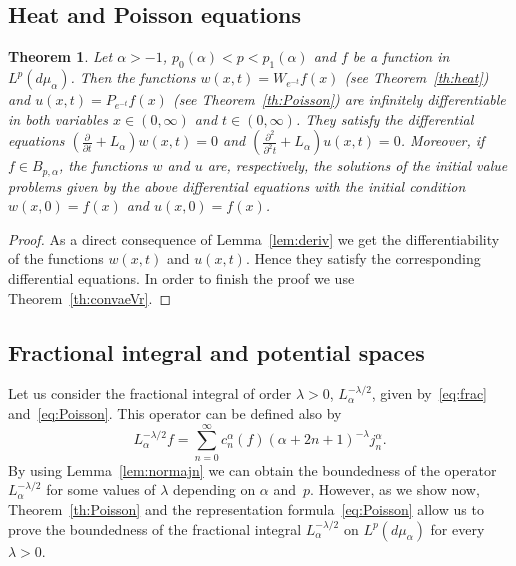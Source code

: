 \documentclass[11pt,a4paper]{amsart}
\newcommand{\mua}{d\mu_\alpha}
\theoremstyle{plain}
\newtheorem{theor}{Theorem}
\theoremstyle{remark}
\begin{document}
\subsection{Heat and Poisson equations}

\begin{theor}
\label{th:DE}
Let $\alpha > -1$, $p_0(\alpha) < p < p_1(\alpha)$ and  $f$ be a function in $L^p(\mua)$.
Then the functions $w(x,t) = W_{e^{-t}}f(x)$ (see Theorem~\ref{th:heat})
and $u(x,t) = P_{e^{-t}}f(x)$ (see Theorem~\ref{th:Poisson}) are infinitely differentiable in both variables $x\in (0,\infty)$ and $t\in(0,\infty)$.
They satisfy the differential equations
$\left( \frac{\partial}{\partial t} + L_\alpha \right) w(x,t) = 0$
and $\left( \frac{\partial^2}{\partial^2 t} + L_\alpha \right) u(x,t) = 0$.
Moreover, if $f\in B_{p,\alpha}$, the functions $w$ and $u$ are, respectively,
the solutions of the initial value problems given by the above differential equations
with the initial condition $w(x,0)=f(x)$ and $u(x,0)=f(x)$.
\end{theor}

\begin{proof}
As a direct consequence of Lemma~\ref{lem:deriv} we get the differentiability
of the functions $w(x,t)$ and $u(x,t)$.
Hence they satisfy the  corresponding differential equations.
In order to finish the proof we use Theorem~\ref{th:convaeVr}.
\end{proof}

\subsection{Fractional integral and potential spaces}

Let us consider the fractional integral of order $\lambda > 0$, $L_\alpha^{-\lambda/2}$, given by~\eqref{eq:frac} and~\eqref{eq:Poisson}. This
operator can be defined also by 
\[
   L_\alpha^{-\lambda/2} f
   =\sum_{n=0}^\infty c_n^\alpha(f) (\alpha+2n+1)^{-\lambda} j_n^\alpha.
\]
By using Lemma~\ref{lem:normajn} we can obtain the boundedness of the operator
$L_\alpha^{-\lambda/2}$ for some values of $\lambda$ depending on $\alpha$
and~$p$. However, as we show now, Theorem~\ref{th:Poisson} and the representation formula~\eqref{eq:Poisson} allow us to prove the boundedness of the fractional integral $L_\alpha^{-\lambda/2}$ on $L^p(d\mu_\alpha)$ for every $\lambda>0$.
\end{document}
